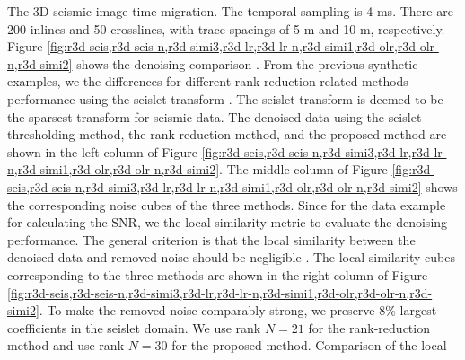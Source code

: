  The 3D seismic image  time migration.  The temporal sampling  is 4 ms.  There are 200 inlines and 50 crosslines, with trace spacings of 5 m and 10 m, respectively. Figure \ref{fig:r3d-seis,r3d-seis-n,r3d-simi3,r3d-lr,r3d-lr-n,r3d-simi1,r3d-olr,r3d-olr-n,r3d-simi2} shows the denoising comparison . From the previous synthetic examples, we  the differences for different rank-reduction related methods performance using the seislet transform \cite[]{fomel2010seislet}. The seislet transform is deemed to be the sparsest transform for seismic data. The denoised data using the seislet thresholding method, the rank-reduction method, and the proposed method are shown in the left column of Figure \ref{fig:r3d-seis,r3d-seis-n,r3d-simi3,r3d-lr,r3d-lr-n,r3d-simi1,r3d-olr,r3d-olr-n,r3d-simi2}. The middle column of Figure \ref{fig:r3d-seis,r3d-seis-n,r3d-simi3,r3d-lr,r3d-lr-n,r3d-simi1,r3d-olr,r3d-olr-n,r3d-simi2} shows the corresponding noise cubes of the three methods. Since for the  data example\dlo{,}  for calculating the SNR, we   the local similarity metric to evaluate the denoising performance. The general criterion is that the local similarity between the denoised data and removed noise should be negligible . The local similarity cubes corresponding to the three methods are shown in the right column of Figure \ref{fig:r3d-seis,r3d-seis-n,r3d-simi3,r3d-lr,r3d-lr-n,r3d-simi1,r3d-olr,r3d-olr-n,r3d-simi2}. To make the removed noise comparably strong, we preserve 8\% largest coefficients in the seislet domain. We use rank $N=21$ for the rank-reduction method and use rank $N=30$ for the proposed method. Comparison of the local 